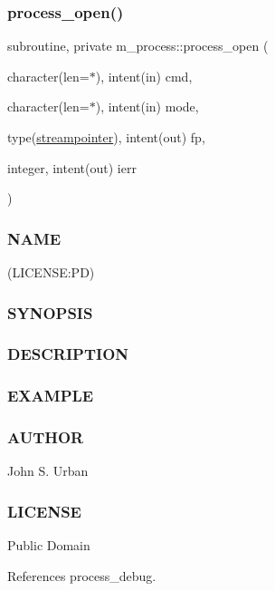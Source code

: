\subsubsection{\texorpdfstring{process\+\_\+open()}{process\_open()}}
{\footnotesize\ttfamily subroutine, private m\+\_\+process\+::process\+\_\+open (\begin{DoxyParamCaption}\item[{character(len=$\ast$), intent(in)}]{cmd,  }\item[{character(len=$\ast$), intent(in)}]{mode,  }\item[{type(\mbox{\hyperlink{structm__process_1_1streampointer}{streampointer}}), intent(out)}]{fp,  }\item[{integer, intent(out)}]{ierr }\end{DoxyParamCaption})\hspace{0.3cm}{\ttfamily [private]}}



\subsubsection*{N\+A\+ME}

(L\+I\+C\+E\+N\+SE\+:PD) \subsubsection*{S\+Y\+N\+O\+P\+S\+IS}

\subsubsection*{D\+E\+S\+C\+R\+I\+P\+T\+I\+ON}

\subsubsection*{E\+X\+A\+M\+P\+LE}

\subsubsection*{A\+U\+T\+H\+OR}

John S. Urban \subsubsection*{L\+I\+C\+E\+N\+SE}

Public Domain 

References process\+\_\+debug.

